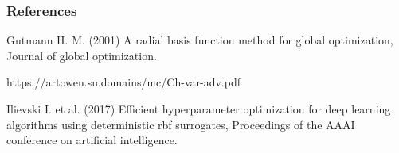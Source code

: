 \documentclass{beamer}
\begin{document}
\begin{frame}
  \frametitle{References}
  \begin{thebibliography}{9}
    
    Gutmann H. M. (2001) A radial basis function method for global optimization, Journal of global optimization.

    https://artowen.su.domains/mc/Ch-var-adv.pdf

    Ilievski I. et al. (2017) Efficient hyperparameter optimization for deep learning algorithms using deterministic rbf surrogates, Proceedings of the AAAI conference on artificial intelligence.
    \end{thebibliography}
  
\end{frame}
\end{document}
